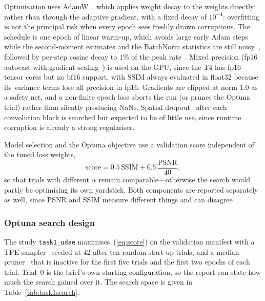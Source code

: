 \documentclass[conference]{IEEEtran}
\begin{document}
Optimisation uses AdamW~\cite{loshchilov2019decoupled}, which applies weight
decay to the weights directly rather than through the adaptive gradient, with a
fixed decay of $10^{-4}$: overfitting is not the principal risk when every epoch
sees freshly drawn corruptions. The schedule is one epoch of linear warm-up,
which avoids large early Adam steps while the second-moment estimates and the
BatchNorm statistics are still noisy~\cite{goyal2017accurate}, followed by
per-step cosine decay to $1\%$ of the peak rate~\cite{loshchilov2017sgdr}. Mixed
precision (fp16 autocast with gradient scaling~\cite{micikevicius2018mixed}) is
used on the GPU, since the T4 has fp16 tensor cores but no bf16 support, with
SSIM always evaluated in float32 because its variance terms lose all precision
in fp16. Gradients are clipped at norm 1.0 as a safety net, and a non-finite
epoch loss aborts the run (or prunes the Optuna trial) rather than silently
producing NaNs. Spatial dropout~\cite{tompson2015efficient,srivastava2014dropout}
after each convolution block is searched but expected to be of little use, since
runtime corruption is already a strong regulariser.

Model selection and the Optuna objective use a validation score independent of
the tuned loss weights,
\begin{equation}
  \text{score} = 0.5\,\mathrm{SSIM} + 0.5\,\frac{\mathrm{PSNR}}{40},
  \label{eq:score}
\end{equation}
so that trials with different $\alpha$ remain comparable---otherwise the search
would partly be optimising its own yardstick. Both components are reported
separately as well, since PSNR and SSIM measure different things and can
disagree~\cite{hore2010image}.

\subsubsection{Optuna search design}

The study \texttt{task1\_udae} maximises~(\ref{eq:score}) on the validation
manifest with a TPE sampler~\cite{bergstra2011algorithms,akiba2019optuna} seeded
at 42 after ten random start-up trials, and a median
pruner~\cite{golovin2017google} that is inactive for the first five trials and
the first two epochs of each trial. Trial~0 is the brief's own starting
configuration, so the report can state how much the search gained over it. The
search space is given in Table~\ref{tab:task1search}.
\end{document}
